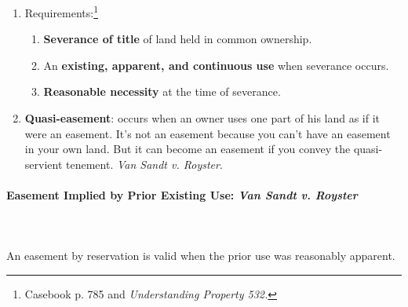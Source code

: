 \begin{enumerate}
    \item Requirements:\footnote{Casebook p. 785 and \emph{Understanding 
    Property 532.}}
    \begin{enumerate}
        \item \textbf{Severance of title} of land held in common ownership.
        \item An \textbf{existing, apparent, and continuous use} when 
        severance occurs.
        \item \textbf{Reasonable necessity} at the time of severance.
    \end{enumerate}
    \item \textbf{Quasi-easement}: occurs when an owner uses one part of his 
    land as if it were an easement. It's not an easement because you can't 
    have an easement in your own land. But it can become an easement if you 
    convey the quasi-servient tenement. \emph{Van Sandt v. Royster}.
\end{enumerate}

\paragraph{Easement Implied by Prior Existing Use: \emph{Van Sandt v. Royster}}
~\\\\
An easement by reservation is valid when the prior use was reasonably 
apparent.

